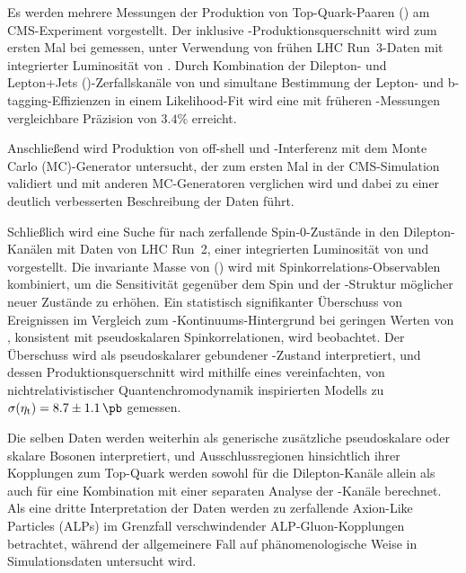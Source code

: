 Es werden mehrere Messungen der Produktion von Top-Quark-Paaren (\ttbar) am CMS-Experiment vorgestellt. Der inklusive \ttbar-Produktionsquerschnitt \sigmatt wird zum ersten Mal bei \sqrtsRIII gemessen, unter Verwendung von fr{\"u}hen LHC Run~3-Daten mit integrierter Luminosit{\"a}t von \lumiRIII. Durch Kombination der Dilepton- und Lepton+Jets (\ljets)-Zerfallskan{\"a}le von \ttbar und simultane Bestimmung der Lepton- und b-tagging-Effizienzen in einem Likelihood-Fit wird eine mit fr{\"u}heren \sigmatt-Messungen vergleichbare Pr{\"a}zision von $3.4\%$ erreicht.

Anschließend wird Produktion von off-shell \ttbar und \tttW-Interferenz mit dem Monte Carlo (MC)-Generator \bbfourl untersucht, der zum ersten Mal in der CMS-Simulation validiert und mit anderen MC-Generatoren verglichen wird und dabei zu einer deutlich verbesserten Beschreibung der Daten f{\"u}hrt.

Schlie{\ss}lich wird eine Suche f{\"ur} nach \ttbar zerfallende Spin-0-Zust{\"a}nde in den Dilepton-Kan{\"a}len mit Daten von LHC Run~2, einer integrierten Luminosit{\"a}t von \lumiRII und \sqrtsRII vorgestellt. Die invariante Masse von \ttbar (\mtt) wird mit Spinkorrelations-Observablen kombiniert, um die Sensitivit{\"at} gegen{\"u}ber dem Spin und der \CP-Struktur m{\"o}glicher neuer Zust{\"a}nde zu erh{\"o}hen. Ein statistisch signifikanter {\"U}berschuss von Ereignissen im Vergleich zum \ttbar-Kontinuums-Hintergrund bei geringen Werten von \mtt, konsistent mit pseudoskalaren Spinkorrelationen, wird beobachtet. Der {\"U}berschuss wird als pseudoskalarer gebundener \ttbar-Zustand \etat interpretiert, und dessen Produktionsquerschnitt wird mithilfe eines vereinfachten, von nichtrelativistischer Quantenchromodynamik inspirierten Modells zu $\sigetat =  8.7 \pm 1.1  \, \si{\pb}$ gemessen.

Die selben Daten werden weiterhin als generische zus{\"a}tzliche pseudoskalare oder skalare Bosonen interpretiert, und Ausschlussregionen 
hinsichtlich ihrer Kopplungen zum Top-Quark werden sowohl f{\"u}r die Dilepton-Kan{\"a}le allein als auch f{\"u}r eine Kombination mit einer separaten Analyse der \ljets-Kan{\"a}le berechnet. Als eine dritte Interpretation der Daten werden zu \ttbar zerfallende Axion-Like Particles (ALPs) im Grenzfall verschwindender ALP-Gluon-Kopplungen betrachtet, w{\"a}hrend der allgemeinere Fall auf ph{\"a}nomenologische Weise in Simulationsdaten untersucht wird.

